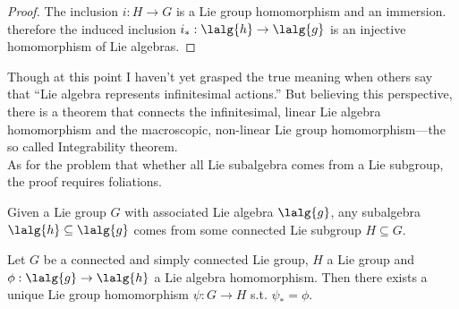 \documentclass[../main.tex]{subfiles}
\begin{document}
\begin{proof}
    The inclusion \(i : H \to G\) is a Lie group homomorphism and an
    immersion. therefore the induced inclusion \(i_* : \lalg{h} \to \lalg{g}\)
    is an injective homomorphism of Lie algebras.
\end{proof}
\begin{remark}
    Though at this point I haven't yet grasped the true meaning when others
    say that ``Lie algebra represents infinitesimal actions.'' But
    believing this perspective, there is a theorem that connects the
    infinitesimal, linear Lie algebra homomorphism and the macroscopic,
    non-linear Lie group homomorphism---the so called Integrability
    theorem.\\
    As for the problem that whether all Lie subalgebra comes from a Lie
    subgroup, the proof requires foliations.
\end{remark}
\begin{theorem}
\label{thm:Lie-Subalgebra-Comes-From-Subgroups}
    Given a Lie group \(G\) with associated Lie algebra \(\lalg{g}\), 
    any subalgebra \(\lalg{h} \subseteq \lalg{g}\) comes from some
    connected Lie subgroup \(H \subseteq G\).
\end{theorem}
\begin{theorem}
\label{thm:Integrability-for-Lie-Algebra-Homomorphisms}
    Let \(G\) be a connected and simply connected Lie group, \(H\) a Lie group
    and \(\phi : \lalg{g} \to \lalg{h}\) a Lie algebra homomorphism. Then
    there exists a unique Lie group homomorphism \(\psi : G \to H\) s.t.
    \(\psi_* = \phi\).
\end{theorem}
\end{document}
